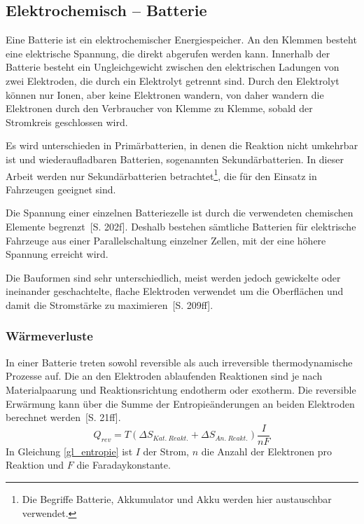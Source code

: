 \subsection{Elektrochemisch – Batterie} %
Eine Batterie ist ein elektrochemischer Energiespeicher. An den Klemmen besteht eine elektrische Spannung, die direkt abgerufen werden kann. Innerhalb der Batterie besteht ein Ungleichgewicht zwischen den elektrischen Ladungen von zwei Elektroden, die durch ein Elektrolyt getrennt sind. Durch den Elektrolyt können nur Ionen, aber keine Elektronen wandern, von daher wandern die Elektronen durch den Verbraucher von Klemme zu Klemme, sobald der Stromkreis geschlossen wird.

Es wird unterschieden in Primärbatterien, in denen die Reaktion nicht umkehrbar ist und wiederaufladbaren Batterien, sogenannten Sekundärbatterien. In dieser Arbeit werden nur Sekundärbatterien betrachtet\footnote{Die Begriffe Batterie, Akkumulator und Akku werden hier austauschbar verwendet.}, die für den Einsatz in Fahrzeugen geeignet sind.

Die Spannung einer einzelnen Batteriezelle ist durch die verwendeten chemischen Elemente begrenzt~\cite{Sterner:2014}[S. 202f]. Deshalb bestehen sämtliche Batterien für elektrische Fahrzeuge aus einer Parallelschaltung einzelner Zellen, mit der eine höhere Spannung erreicht wird.

Die Bauformen sind sehr unterschiedlich, meist werden jedoch gewickelte oder ineinander geschachtelte, flache Elektroden verwendet um die Oberflächen und damit die Stromstärke zu maximieren~\cite{Sterner:2014}[S. 209ff].

\subsubsection{Wärmeverluste} \label{sec_waermeverluste}
In einer Batterie treten sowohl reversible als auch irreversible thermodynamische Prozesse auf. Die an den Elektroden ablaufenden Reaktionen sind je nach Materialpaarung und Reaktionsrichtung endotherm oder exotherm. Die reversible Erwärmung kann über die Summe der Entropieänderungen an beiden Elektroden berechnet werden~\cite{KiehneBattery}[S. 21ff].
\begin{equation}\label{gl_entropie}
	Q_{rev}=T(\Delta S_{Kat.~Reakt.} + \Delta S_{An.~Reakt.}) \frac{I}{nF}	
\end{equation}
In Gleichung \ref{gl_entropie} ist $I$ der Strom, $n$ die Anzahl der Elektronen pro Reaktion und $F$ die Faradaykonstante. 

